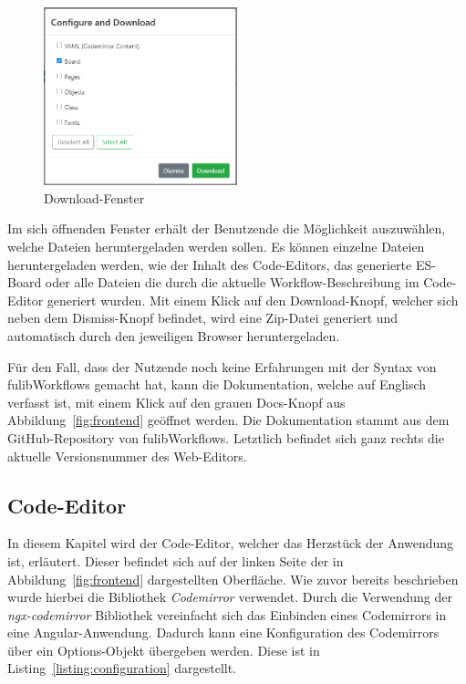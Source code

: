 \begin{figure}[h]
    \centering
    \includegraphics[width=0.5\textwidth]{images/3.2/download}
    \caption{Download-Fenster}
    \label{fig:download}
\end{figure}

Im sich öffnenden Fenster erhält der Benutzende die Möglichkeit auszuwählen, welche Dateien heruntergeladen werden sollen.
Es können einzelne Dateien heruntergeladen werden, wie der Inhalt des Code-Editors, das generierte \ac{ES}-Board oder alle Dateien
die durch die aktuelle Workflow-Beschreibung im Code-Editor generiert wurden.
Mit einem Klick auf den Download-Knopf, welcher sich neben dem Dismiss-Knopf befindet, wird eine Zip-Datei generiert und automatisch durch den jeweiligen Browser heruntergeladen.

Für den Fall, dass der Nutzende noch keine Erfahrungen mit der Syntax von fulibWorkflows gemacht hat, kann die Dokumentation, welche auf Englisch verfasst ist, mit einem Klick
auf den grauen Docs-Knopf aus Abbildung~\ref{fig:frontend} geöffnet werden.
Die Dokumentation stammt aus dem GitHub-Repository von fulibWorkflows.
Letztlich befindet sich ganz rechts die aktuelle Versionsnummer des Web-Editors.

\subsection{Code-Editor}\label{subsec:codeeditor}
In diesem Kapitel wird der Code-Editor, welcher das Herzstück der Anwendung ist, erläutert.
Dieser befindet sich auf der linken Seite der in Abbildung~\ref{fig:frontend} dargestellten Oberfläche.
Wie zuvor bereits beschrieben wurde hierbei die Bibliothek \textit{Codemirror} verwendet.
Durch die Verwendung der \textit{ngx-codemirror} Bibliothek vereinfacht sich das Einbinden eines Codemirrors in eine Angular-Anwendung.
Dadurch kann eine Konfiguration des Codemirrors über ein Options-Objekt übergeben werden.
Diese ist in Listing~\ref{listing:configuration} dargestellt.

